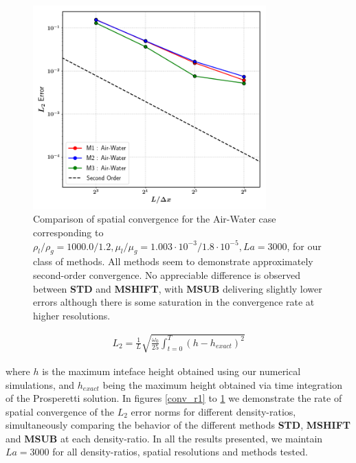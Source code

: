 \begin{figure}[h!]
    \centering
    \includegraphics[width = 0.8\textwidth]{plots/capwave/conv_aw.png}
	\caption{Comparison of spatial convergence for the Air-Water case corresponding to $\rho_l/\rho_g = 1000.0/1.2 , \mu_l/\mu_g = 1.003\cdot 10^{-3}/1.8\cdot 10^{-5} , La = 3000 $, for our class of methods. All methods seem to demonstrate approximately second-order convergence. No appreciable difference is observed between \textbf{STD} and \textbf{MSHIFT}, with \textbf{MSUB} delivering slightly lower errors although there is some saturation in the convergence rate at higher resolutions. }
    \label{conv_aw}
\end{figure}

\begin{align}
	L_2 = \frac{1}{L} \sqrt{\frac{\omega_0}{25} \int_{t=0}^{T} \left(h - h_{exact}\right)^2}
\end{align}

where $h$ is the maximum inteface height obtained using our numerical simulations, and $h_{exact}$ being the maximum height obtained via time integration of the Prosperetti solution. In figures \ref{conv_r1} to \ref{conv_aw} we demonstrate the rate of spatial convergence of the $L_2$ error norms for different density-ratios, simultaneously comparing the behavior of the different methods \textbf{STD}, \textbf{MSHIFT} and \textbf{MSUB} at each density-ratio. In all the results presented, we maintain $La = 3000$ for all density-ratios, spatial resolutions and methods tested.  

